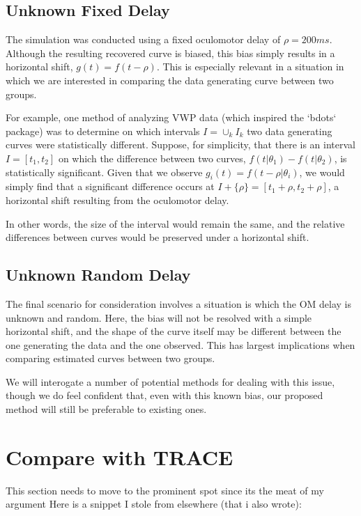 \documentclass{article}
\begin{document}
\subsection{Unknown Fixed Delay}


The simulation was conducted using a fixed oculomotor delay of $\rho = 200ms$. Although the resulting recovered curve is biased, this bias simply results in a horizontal shift, $g(t) = f(t - \rho)$. This is especially relevant in a situation in which we are interested in comparing the data generating curve between two groups. 

For example, one method of analyzing VWP data (which inspired the `bdots` package) was to determine on which intervals $I = \cup_{k} I_k$ two data generating curves were statistically different. Suppose, for simplicity, that there is an interval $I = [t_1, t_2]$ on which the difference between two curves, $f(t | \theta_1) - f(t|\theta_2)$, is statistically significant. Given that we observe $g_i(t) = f(t - \rho | \theta_i)$, we would simply find that a significant difference occurs at $I + \{\rho\} = [t_1 + \rho, t_2 + \rho]$, a horizontal shift resulting from the oculomotor delay.

In other words, the size of the interval would remain the same, and the relative differences between curves would be preserved under a horizontal shift. 

\subsection{Unknown Random Delay}


The final scenario for consideration involves a situation is which the OM delay is unknown and random. Here, the bias will not be resolved with a simple horizontal shift, and the shape of the curve itself may be different between the one generating the data and the one observed. This has largest implications when comparing estimated curves between two groups.

We will interogate a number of potential methods for dealing with this issue, though we do feel confident that, even with this known bias, our proposed method will still be preferable to existing ones. 

\section{Compare with TRACE}

This section needs to move to the prominent spot since its the meat of my argument 
Here is a snippet I stole from elsewhere (that i also wrote):
\end{document}
